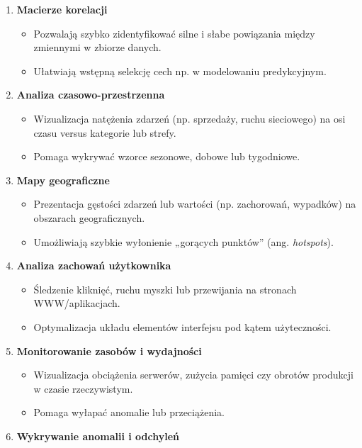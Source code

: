 \documentclass[
  polish,
  letterpaper,
  DIV=11,
  numbers=noendperiod]{scrreprt}
\providecommand{\tightlist}{%
  \setlength{\itemsep}{0pt}\setlength{\parskip}{0pt}}
\begin{document}
\begin{enumerate}
\def\labelenumi{\arabic{enumi}.}
\tightlist
\item
  \textbf{Macierze korelacji}

  \begin{itemize}
  \tightlist
  \item
    Pozwalają szybko zidentyfikować silne i słabe powiązania między
    zmiennymi w zbiorze danych.\\
  \item
    Ułatwiają wstępną selekcję cech np. w modelowaniu predykcyjnym.
  \end{itemize}
\item
  \textbf{Analiza czasowo-przestrzenna}

  \begin{itemize}
  \tightlist
  \item
    Wizualizacja natężenia zdarzeń (np. sprzedaży, ruchu sieciowego) na
    osi czasu versus kategorie lub strefy.\\
  \item
    Pomaga wykrywać wzorce sezonowe, dobowe lub tygodniowe.
  \end{itemize}
\item
  \textbf{Mapy geograficzne}

  \begin{itemize}
  \tightlist
  \item
    Prezentacja gęstości zdarzeń lub wartości (np. zachorowań, wypadków)
    na obszarach geograficznych.\\
  \item
    Umożliwiają szybkie wyłonienie „gorących punktów'' (ang.
    \emph{hotspots}).
  \end{itemize}
\item
  \textbf{Analiza zachowań użytkownika}

  \begin{itemize}
  \tightlist
  \item
    Śledzenie kliknięć, ruchu myszki lub przewijania na stronach
    WWW/aplikacjach.\\
  \item
    Optymalizacja układu elementów interfejsu pod kątem użyteczności.
  \end{itemize}
\item
  \textbf{Monitorowanie zasobów i wydajności}

  \begin{itemize}
  \tightlist
  \item
    Wizualizacja obciążenia serwerów, zużycia pamięci czy obrotów
    produkcji w czasie rzeczywistym.\\
  \item
    Pomaga wyłapać anomalie lub przeciążenia.
  \end{itemize}
\item
  \textbf{Wykrywanie anomalii i odchyleń}


\end{enumerate}
\end{document}
